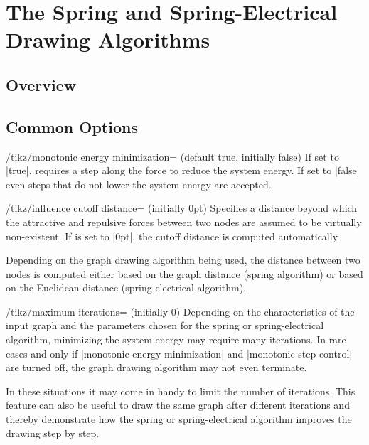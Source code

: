 \section{The Spring and Spring-Electrical Drawing Algorithms}

\subsection{Overview}

\subsection{Common Options}

\begin{key}{/tikz/monotonic energy minimization= 
  (default true, initially false)}
  If set to |true|, requires a step along the force to reduce the
  system energy. If set to |false| even steps that do not lower the 
  system energy are accepted.
  \begin{codeexample}[]
  \end{codeexample}
\end{key}

\begin{key}{/tikz/influence cutoff distance= (initially
  0pt)}
  Specifies a distance beyond which the attractive and repulsive forces 
  between two nodes are assumed to be virtually non-existent. If 
   is set to |0pt|, the cutoff distance is computed 
  automatically.

  Depending on the graph drawing algorithm being used, the distance
  between two nodes is computed either based on the graph distance
  (spring algorithm) or based on the Euclidean distance
  (spring-electrical algorithm).
  \begin{codeexample}[]
  \end{codeexample}
\end{key}

\begin{key}{/tikz/maximum iterations= (initially 0)}
  Depending on the characteristics of the input graph and the parameters
  chosen for the spring or spring-electrical algorithm, minimizing the
  system energy may require many iterations. In rare cases and only if
  |monotonic energy minimization| and |monotonic step control| are
  turned off, the graph drawing algorithm may not even terminate.

  In these situations it may come in handy to limit the number of
  iterations. This feature can also be useful to draw the same graph
  after different iterations and thereby demonstrate how the spring or
  spring-electrical algorithm improves the drawing step by step.
  \begin{codeexample}[]
  \end{codeexample}
\end{key}


